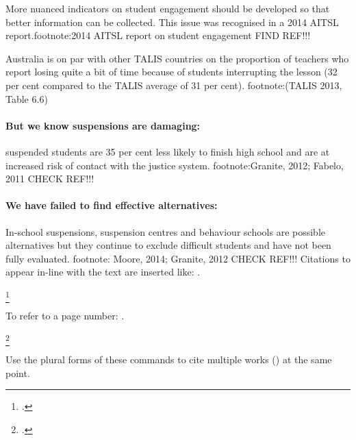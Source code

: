 More nuanced indicators on student engagement should be developed so that better information can be collected. This issue was recognised in a 2014 AITSL report.footnote:2014 AITSL report on student engagement FIND REF!!!


Australia is on par with other TALIS countries on the proportion of teachers who report losing quite a bit of time because of students interrupting the lesson (32 per cent compared to the TALIS average of 31 per cent). footnote:(TALIS 2013, Table 6.6)

\paragraph{But we know suspensions are damaging:} suspended students are 35 per cent less likely to finish high school and are at increased risk of contact with the justice system. footnote:Granite, 2012; Fabelo, 2011 CHECK REF!!!

\paragraph{We have failed to find effective alternatives:} In-school suspensions, suspension centres and behaviour schools are possible alternatives but they continue to exclude difficult students and have not been fully evaluated. footnote: Moore, 2014; Granite, 2012 CHECK REF!!!
Citations to appear in-line with the text are inserted like: \textcite{Daley-etal-2016-SAPTO}.

\footcite{Daley-etal-2016-Assessing-2016-super-tax-reforms}

To refer to a page number: \textcite[][30]{Daley-etal-2016-SAPTO}.

\footcite[][Chapter~4]{Daley-etal-2016-SAPTO}

Use the plural forms of these commands to cite multiple works (\textcites{Piketty2013}{Leigh-2013-BattlersBillionaires}) at the same point.
